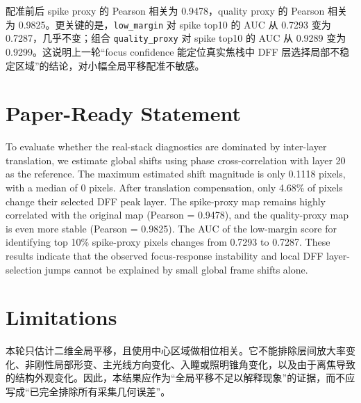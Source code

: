 \documentclass[11pt]{article}
\begin{document}
配准前后 spike proxy 的 Pearson 相关为 0.9478，quality proxy 的 Pearson 相关为 0.9825。更关键的是，\texttt{low\_margin} 对 spike top10 的 AUC 从 0.7293 变为 0.7287，几乎不变；组合 \texttt{quality\_proxy} 对 spike top10 的 AUC 从 0.9289 变为 0.9299。这说明上一轮“focus confidence 能定位真实焦栈中 DFF 层选择局部不稳定区域”的结论，对小幅全局平移配准不敏感。

\section{Paper-Ready Statement}

To evaluate whether the real-stack diagnostics are dominated by inter-layer translation, we estimate global shifts using phase cross-correlation with layer 20 as the reference. The maximum estimated shift magnitude is only 0.1118 pixels, with a median of 0 pixels. After translation compensation, only 4.68\% of pixels change their selected DFF peak layer. The spike-proxy map remains highly correlated with the original map (Pearson = 0.9478), and the quality-proxy map is even more stable (Pearson = 0.9825). The AUC of the low-margin score for identifying top 10\% spike-proxy pixels changes from 0.7293 to 0.7287. These results indicate that the observed focus-response instability and local DFF layer-selection jumps cannot be explained by small global frame shifts alone.

\section{Limitations}

本轮只估计二维全局平移，且使用中心区域做相位相关。它不能排除层间放大率变化、非刚性局部形变、主光线方向变化、入瞳或照明锥角变化，以及由于离焦导致的结构外观变化。因此，本结果应作为“全局平移不足以解释现象”的证据，而不应写成“已完全排除所有采集几何误差”。
\end{document}
